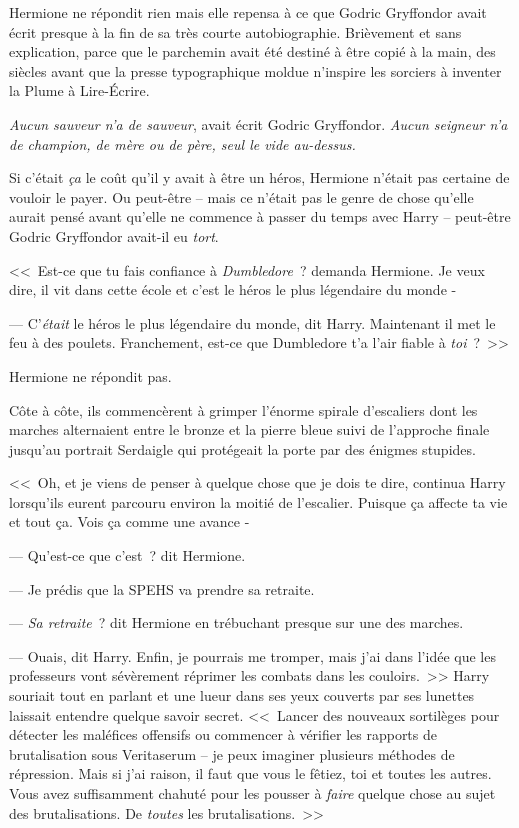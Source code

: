 Hermione ne répondit rien mais elle repensa à ce que Godric Gryffondor avait écrit presque à la fin de sa très courte autobiographie. Brièvement et sans explication, parce que le parchemin avait été destiné à être copié à la main, des siècles avant que la presse typographique moldue n'inspire les sorciers à inventer la Plume à Lire-Écrire.

\emph{Aucun sauveur n'a de sauveur}, avait écrit Godric Gryffondor. \emph{Aucun seigneur n'a de champion, de mère ou de père, seul le vide au-dessus.}

Si c'était \emph{ça} le coût qu'il y avait à être un héros, Hermione n'était pas certaine de vouloir le payer. Ou peut-être -- mais ce n'était pas le genre de chose qu'elle aurait pensé avant qu'elle ne commence à passer du temps avec Harry -- peut-être Godric Gryffondor avait-il eu \emph{tort}.

<<~Est-ce que tu fais confiance à \emph{Dumbledore}~? demanda Hermione. Je veux dire, il vit dans cette école et c'est le héros le plus légendaire du monde -

--- C'\emph{était} le héros le plus légendaire du monde, dit Harry. Maintenant il met le feu à des poulets. Franchement, est-ce que Dumbledore t'a l'air fiable à \emph{toi}~?~>>

Hermione ne répondit pas.

Côte à côte, ils commencèrent à grimper l'énorme spirale d'escaliers dont les marches alternaient entre le bronze et la pierre bleue suivi de l'approche finale jusqu'au portrait Serdaigle qui protégeait la porte par des énigmes stupides.

<<~Oh, et je viens de penser à quelque chose que je dois te dire, continua Harry lorsqu'ils eurent parcouru environ la moitié de l'escalier. Puisque ça affecte ta vie et tout ça. Vois ça comme une avance -

--- Qu'est-ce que c'est~? dit Hermione.

--- Je prédis que la SPEHS va prendre sa retraite.

--- \emph{Sa retraite}~? dit Hermione en trébuchant presque sur une des marches.

--- Ouais, dit Harry. Enfin, je pourrais me tromper, mais j'ai dans l'idée que les professeurs vont sévèrement réprimer les combats dans les couloirs.~>> Harry souriait tout en parlant et une lueur dans ses yeux couverts par ses lunettes laissait entendre quelque savoir secret. <<~Lancer des nouveaux sortilèges pour détecter les maléfices offensifs ou commencer à vérifier les rapports de brutalisation sous Veritaserum -- je peux imaginer plusieurs méthodes de répression. Mais si j'ai raison, il faut que vous le fêtiez, toi et toutes les autres. Vous avez suffisamment chahuté pour les pousser à \emph{faire} quelque chose au sujet des brutalisations. De \emph{toutes} les brutalisations.~>>

